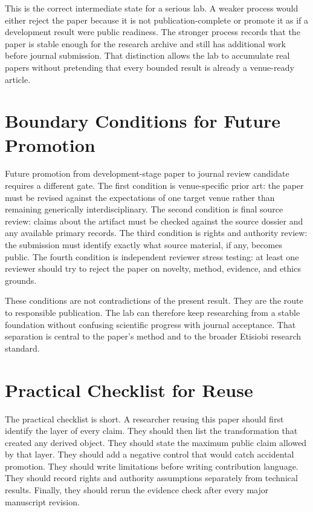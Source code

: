 \documentclass[sigconf,nonacm]{acmart}
\begin{document}
This is the correct intermediate state for a serious lab. A weaker process would
either reject the paper because it is not publication-complete or promote it as
if a development result were public readiness. The stronger process records that
the paper is stable enough for the research archive and still has additional
work before journal submission. That distinction allows the lab to accumulate
real papers without pretending that every bounded result is already a
venue-ready article.

\section{Boundary Conditions for Future Promotion}
Future promotion from development-stage paper to journal review candidate
requires a different gate. The first condition is venue-specific prior art: the
paper must be revised against the expectations of one target venue rather than
remaining generically interdisciplinary. The second condition is final source
review: claims about the artifact must be checked against the source dossier and
any available primary records. The third condition is rights and authority
review: the submission must identify exactly what source material, if any,
becomes public. The fourth condition is independent reviewer stress testing: at
least one reviewer should try to reject the paper on novelty, method, evidence,
and ethics grounds.

These conditions are not contradictions of the present result. They are the
route to responsible publication. The lab can therefore keep researching from a
stable foundation without confusing scientific progress with journal acceptance.
That separation is central to the paper's method and to the broader Etisiobi
research standard.

\section{Practical Checklist for Reuse}
The practical checklist is short. A researcher reusing this paper should first
identify the layer of every claim. They should then list the transformation that
created any derived object. They should state the maximum public claim allowed
by that layer. They should add a negative control that would catch accidental
promotion. They should write limitations before writing contribution language.
They should record rights and authority assumptions separately from technical
results. Finally, they should rerun the evidence check after every major
manuscript revision.
\end{document}
